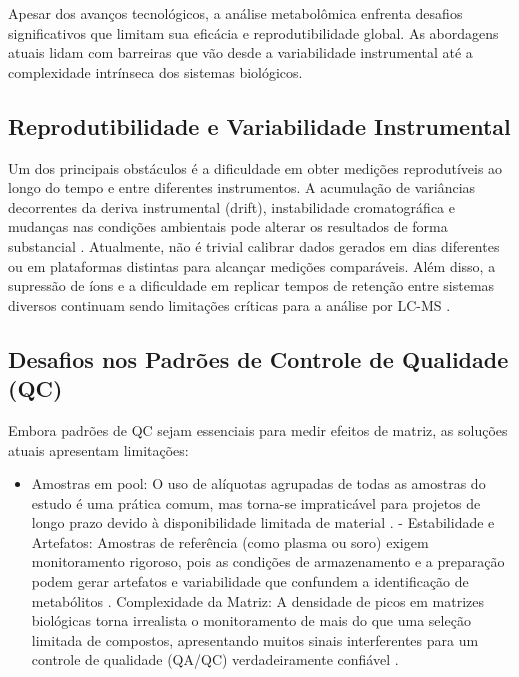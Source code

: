 Apesar dos avanços tecnológicos, a análise metabolômica enfrenta desafios significativos que limitam sua eficácia e reprodutibilidade global. As abordagens atuais lidam com barreiras que vão desde a variabilidade instrumental até a complexidade intrínseca dos sistemas biológicos.

\subsection{Reprodutibilidade e Variabilidade Instrumental}

Um dos principais obstáculos é a dificuldade em obter medições reprodutíveis ao longo do tempo e entre diferentes instrumentos. A acumulação de variâncias decorrentes da deriva instrumental (drift), instabilidade cromatográfica e mudanças nas condições ambientais pode alterar os resultados de forma substancial \cite{jong2018challenges}. Atualmente, não é trivial calibrar dados gerados em dias diferentes ou em plataformas distintas para alcançar medições comparáveis. Além disso, a supressão de íons e a dificuldade em replicar tempos de retenção entre sistemas diversos continuam sendo limitações críticas para a análise por LC-MS \cite{johnson2012challenges}.

\subsection{Desafios nos Padrões de Controle de Qualidade (QC)}

Embora padrões de QC sejam essenciais para medir efeitos de matriz, as soluções atuais apresentam limitações: 
\begin{itemize}
\item { Amostras em pool: O uso de alíquotas agrupadas de todas as amostras do estudo é uma prática comum, mas torna-se impraticável para projetos de longo prazo devido à disponibilidade limitada de material \cite{jong2018challenges}.}
- Estabilidade e Artefatos: Amostras de referência (como plasma ou soro) exigem monitoramento rigoroso, pois as condições de armazenamento e a preparação podem gerar artefatos e variabilidade que confundem a identificação de metabólitos \cite{jong2018challenges, johnson2012challenges}.
Complexidade da Matriz: A densidade de picos em matrizes biológicas torna irrealista o monitoramento de mais do que uma seleção limitada de compostos, apresentando muitos sinais interferentes para um controle de qualidade (QA/QC) verdadeiramente confiável \cite{jong2018challenges}.
\end{itemize}
